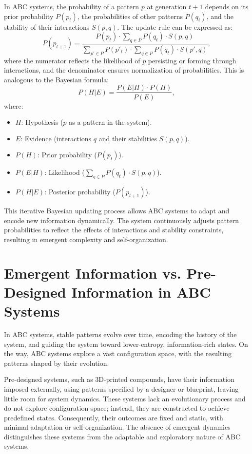 \documentclass[entropy,article,submit,pdftex,moreauthors]{Definitions/mdpi}
\begin{document}
In ABC systems, the probability of a pattern \( p \) at generation \( t+1 \) depends on its prior probability \( P(p_t) \), the probabilities of other patterns \( P(q_t) \), and the stability of their interactions \( S(p, q) \). The update rule can be expressed as:
\[
P(p_{t+1}) = \frac{P(p_t) \cdot \sum_{q \in P} P(q_t) \cdot S(p, q)}{\sum_{p' \in P} P(p'_t) \cdot \sum_{q \in P} P(q_t) \cdot S(p', q)},
\]
where the numerator reflects the likelihood of \( p \) persisting or forming through interactions, and the denominator ensures normalization of probabilities. This is analogous to the Bayesian formula:
\[
P(H|E) = \frac{P(E|H) \cdot P(H)}{P(E)},
\]
where:
\begin{itemize}
    \item[] \( H \): Hypothesis (\( p \) as a pattern in the system).
    \item[] \( E \): Evidence (interactions \( q \) and their stabilities \( S(p, q) \)).
    \item[] \( P(H) \): Prior probability (\( P(p_t) \)).
    \item[] \( P(E|H) \): Likelihood (\( \sum_{q \in P} P(q_t) \cdot S(p, q) \)).
    \item[] \( P(H|E) \): Posterior probability (\( P(p_{t+1}) \)).
\end{itemize}

This iterative Bayesian updating process allows ABC systems to adapt and encode new information dynamically. The system continuously adjusts pattern probabilities to reflect the effects of interactions and stability constraints, resulting in emergent complexity and self-organization.

\section{Emergent Information vs. Pre-Designed Information in ABC Systems}

In ABC systems, stable patterns evolve over time, encoding the history of the system, and guiding the system toward lower-entropy, information-rich states. On the way, ABC systems explore a vast configuration space, with the resulting patterns shaped by their evolution.

Pre-designed systems, such as 3D-printed compounds, have their information imposed externally, using patterns specified by a designer or blueprint, leaving little room for system dynamics. These systems lack an evolutionary process and do not explore configuration space; instead, they are constructed to achieve predefined states. Consequently, their outcomes are fixed and static, with minimal adaptation or self-organization. The absence of emergent dynamics distinguishes these systems from the adaptable and exploratory nature of ABC systems.
\end{document}
